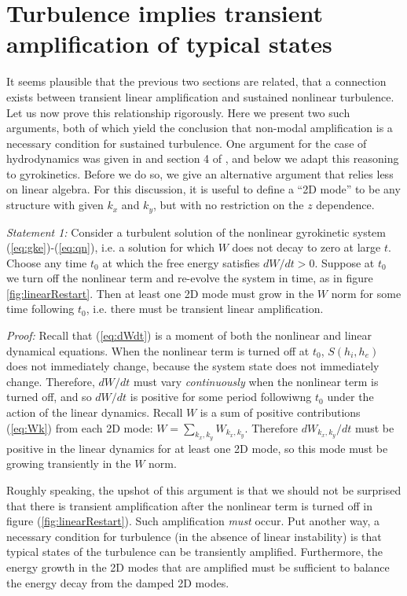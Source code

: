 \documentclass[12pt,superscriptaddress]{revtex4}
\begin{document}
\section{Turbulence implies transient amplification of typical states}
\label{sec:proof}

It seems plausible that the previous two sections are related,
that a connection exists between transient linear amplification and sustained nonlinear turbulence.
Let us now prove this relationship rigorously.
Here we present two such arguments,
both of which yield the conclusion that non-modal amplification is a necessary condition
for sustained turbulence.  One argument for the case of hydrodynamics
was given in \cite{DelSoleNecessity} and section 4 of \cite{DelSoleSurvey},
and below we adapt this reasoning to gyrokinetics.  Before we do so, we give an alternative
argument that relies less on linear algebra.
For this discussion, it is useful to define a ``2D mode'' to be any structure with given $k_x$ and $k_y$,
but with no restriction on the $z$ dependence.

{\it Statement 1:} Consider a turbulent solution of the nonlinear gyrokinetic system (\ref{eq:gke})-(\ref{eq:qn}),
i.e. a solution for which $W$ does not decay to zero at large $t$.
Choose any time $t_0$ at which the free energy satisfies $dW/dt>0$.
Suppose at $t_0$ we turn off the nonlinear term
and re-evolve the system in time, as in figure \ref{fig:linearRestart}.
Then at least one 2D mode must grow in the $W$ norm
for some time following $t_0$, i.e. there must be transient linear amplification.

{\it Proof:}
Recall that (\ref{eq:dWdt}) is a moment of both the nonlinear and linear dynamical equations.
When the nonlinear term is turned off at $t_0$, $S(h_i,h_e)$ does not immediately change, because
the system state does not immediately change. Therefore, $dW/dt$ must vary \emph{continuously}
when the nonlinear term is turned off, and so $dW/dt$ is positive for some period followiwng $t_0$ under the 
action of the linear dynamics.
Recall $W$ is a sum of positive contributions (\ref{eq:Wk}) from each 2D mode:
$W = \sum_{k_x,k_y} W_{k_x,k_y}$.
Therefore $dW_{k_x,k_y}/dt$ must be positive in the linear dynamics for at least one 2D mode,
so this mode must be growing transiently in the $W$ norm.

Roughly speaking, the upshot of this argument is that we should not be surprised that there is transient amplification
after the nonlinear term is turned off in figure (\ref{fig:linearRestart}).
Such amplification \emph{must} occur.
Put another way, a necessary condition
for turbulence (in the absence of linear instability) is that typical states of the turbulence
can be transiently amplified. Furthermore, the energy growth in the 2D modes that are amplified
must be sufficient to balance the energy decay from the damped 2D modes.
\end{document}
